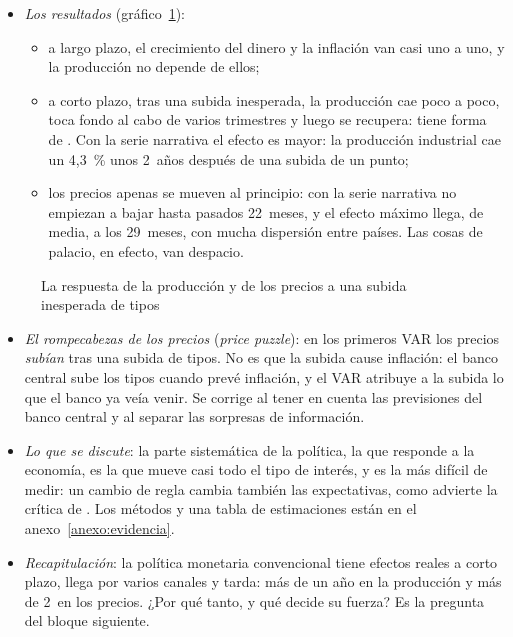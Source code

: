 \documentclass[11pt]{article}
\begin{document}
\begin{itemize}
\item \emph{Los resultados} (gráfico~\ref{fig:respuesta-joroba}):
  \begin{itemize}
  \item a largo plazo, el crecimiento del dinero y la inflación van casi uno a uno, y la producción no depende de ellos\nocite{Walsh2017Monetary};
  \item a corto plazo, tras una subida inesperada, la producción cae poco a poco, toca fondo al cabo de varios trimestres y luego se recupera: tiene forma de \nocite{ChristianoEichenbaumEvans1996Effects}. Con la serie narrativa el efecto es mayor: la producción industrial cae un 4,3~\% unos 2~años después de una subida de un punto\nocite{RomerRomer2004New,Ramey2016Macroeconomic};
  \item los precios apenas se mueven al principio: con la serie narrativa no empiezan a bajar hasta pasados 22~meses\nocite{RomerRomer2004New}, y el efecto máximo llega, de media, a los 29~meses, con mucha dispersión entre países\nocite{HavranekRusnak2013}. Las cosas de palacio, en efecto, van despacio.
  \end{itemize}
\end{itemize}

\begin{figure}[H]
\centering
\caption{La respuesta de la producción y de los precios a una subida inesperada de tipos}\label{fig:respuesta-joroba}
\end{figure}

\begin{itemize}
\item \emph{El rompecabezas de los precios} (\emph{price puzzle}): en los primeros VAR los precios \emph{subían} tras una subida de tipos\nocite{Sims1992Interpreting}. No es que la subida cause inflación: el banco central sube los tipos cuando prevé inflación, y el VAR atribuye a la subida lo que el banco ya veía venir. Se corrige al tener en cuenta las previsiones del banco central\nocite{RomerRomer2004New} y al separar las sorpresas de información\nocite{JarocinskiKaradi2020}.
\item \emph{Lo que se discute}: la parte sistemática de la política, la que responde a la economía, es la que mueve casi todo el tipo de interés, y es la más difícil de medir: un cambio de regla cambia también las expectativas, como advierte la crítica de  . Los métodos y una tabla de estimaciones están en el anexo~\ref{anexo:evidencia}.
\item \emph{Recapitulación}: la política monetaria convencional tiene efectos reales a corto plazo, llega por varios canales y tarda: más de un año en la producción y más de 2~en los precios. ¿Por qué tanto, y qué decide su fuerza? Es la pregunta del bloque siguiente.
\end{itemize}
\end{document}
